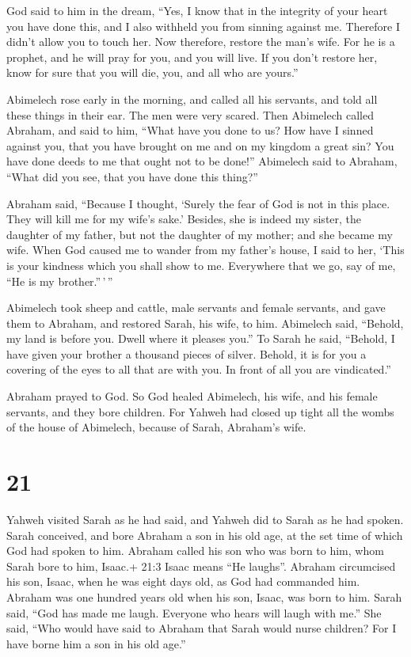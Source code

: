  God said to him in the dream, ``Yes, I know that in the
integrity of your heart you have done this, and I also withheld you from
sinning against me. Therefore I didn't allow you to touch her.
 Now therefore, restore the man's wife. For he is a prophet,
and he will pray for you, and you will live. If you don't restore her,
know for sure that you will die, you, and all who are yours.''

 Abimelech rose early in the morning, and called all his
servants, and told all these things in their ear. The men were very
scared.  Then Abimelech called Abraham, and said to him,
``What have you done to us? How have I sinned against you, that you have
brought on me and on my kingdom a great sin? You have done deeds to me
that ought not to be done!''  Abimelech said to Abraham,
``What did you see, that you have done this thing?''

 Abraham said, ``Because I thought, `Surely the fear of God
is not in this place. They will kill me for my wife's sake.'
 Besides, she is indeed my sister, the daughter of my
father, but not the daughter of my mother; and she became my wife.
 When God caused me to wander from my father's house, I
said to her, `This is your kindness which you shall show to me.
Everywhere that we go, say of me, ``He is my brother.''\,'\,''

 Abimelech took sheep and cattle, male servants and female
servants, and gave them to Abraham, and restored Sarah, his wife, to
him.  Abimelech said, ``Behold, my land is before you.
Dwell where it pleases you.''  To Sarah he said, ``Behold,
I have given your brother a thousand pieces of silver. Behold, it is for
you a covering of the eyes to all that are with you. In front of all you
are vindicated.''

 Abraham prayed to God. So God healed Abimelech, his wife,
and his female servants, and they bore children.  For
Yahweh had closed up tight all the wombs of the house of Abimelech,
because of Sarah, Abraham's wife.

\hypertarget{section-20}{%
\section{21}\label{section-20}}

 Yahweh visited Sarah as he had said, and Yahweh did to
Sarah as he had spoken.  Sarah conceived, and bore Abraham a
son in his old age, at the set time of which God had spoken to him.
 Abraham called his son who was born to him, whom Sarah bore
to him, Isaac.+ 21:3 Isaac means ``He laughs''.  Abraham
circumcised his son, Isaac, when he was eight days old, as God had
commanded him.  Abraham was one hundred years old when his
son, Isaac, was born to him.  Sarah said, ``God has made me
laugh. Everyone who hears will laugh with me.''  She said,
``Who would have said to Abraham that Sarah would nurse children? For I
have borne him a son in his old age.''

